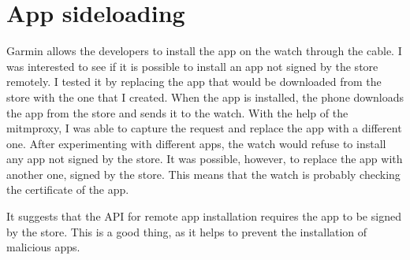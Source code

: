 \section{App sideloading}
\label{app-sideloading}
Garmin allows the developers to install the app on the watch through the cable.
I was interested to see if it is possible to install an app not signed by the store remotely.
I tested it by replacing the app that would be downloaded from the store with the one that I created.
When the app is installed, the phone downloads the app from the store and sends it to the watch.
With the help of the mitmproxy, I was able to capture the request and replace the app with a different one.
After experimenting with different apps, the watch would refuse to install any app not signed by the store.
It was possible, however, to replace the app with another one, signed by the store.
This means that the watch is probably checking the certificate of the app.

It suggests that the API for remote app installation requires the app to be signed by the store.
This is a good thing, as it helps to prevent the installation of malicious apps.
